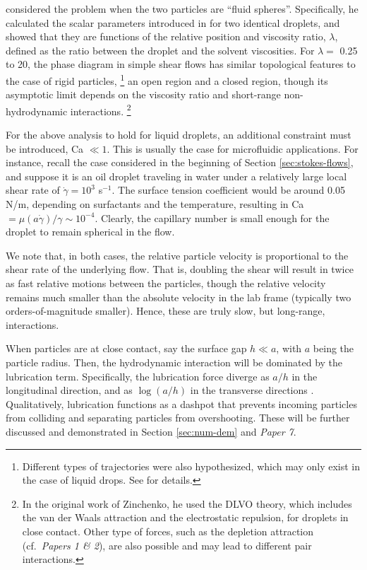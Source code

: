 \cite{Zinchenko1983,Zinchenko1984} considered the problem when the two particles are ``fluid spheres''.
Specifically, he calculated the scalar parameters introduced in \cite{batchelor_green_1972} for two identical droplets, and showed that they are functions of the relative position and viscosity ratio, $\lambda$, defined as the ratio between the droplet and the solvent viscosities.
For $\lambda=$ 0.25 to 20, the phase diagram in simple shear flows has similar topological features to the case of rigid particles,%
\footnote{Different types of trajectories were also hypothesized, which may only exist in the case of liquid drops. See \cite{Zinchenko1984} for details.}
\ie an open region and a closed region, though its asymptotic limit depends on the viscosity ratio and short-range non-hydrodynamic interactions.%
\footnote{In the original work of Zinchenko, he used the DLVO theory, which includes the van der Waals attraction and the electrostatic repulsion, for droplets in close contact. Other type of forces, such as the depletion attraction (cf.\ \emph{Papers 1 \& 2}), are also possible and may lead to different pair interactions.}

For the above analysis to hold for liquid droplets, an additional constraint must be introduced, \ie Ca $\ll 1$.
This is usually the case for microfluidic applications. For instance, recall the case considered in the beginning of Section \ref{sec:stokes-flows}, and suppose it is an oil droplet traveling in water under a relatively large local shear rate of $\dot{\gamma}=10^3$ s$^{-1}$. The surface tension coefficient would be around 0.05 N/m, depending on surfactants and the temperature, resulting in Ca $=\mu(a\dot{\gamma})/\gamma \sim 10^{-4}$. Clearly, the capillary number is small enough for the droplet to remain spherical in the flow.

We note that, in both cases, the relative particle velocity is proportional to the shear rate of the underlying flow. That is, doubling the shear will result in twice as fast relative motions between the particles, though the relative velocity remains much smaller than the absolute velocity in the lab frame (typically two orders-of-magnitude smaller). Hence, these are truly slow, but long-range, interactions.

When particles are at close contact, say the surface gap $h \ll a$, with $a$ being the particle radius. Then, the hydrodynamic interaction will be dominated by the lubrication term. Specifically, the lubrication force diverge as $a/h$ in the longitudinal direction, and as $\log(a/h)$ in the transverse directions \citep{jeffrey_onishi_1984, jeffrey1992}. Qualitatively, lubrication functions as a dashpot that prevents incoming particles from colliding and separating particles from overshooting. These will be further discussed and demonstrated in Section \ref{sec:num-dem} and \emph{Paper 7}.


